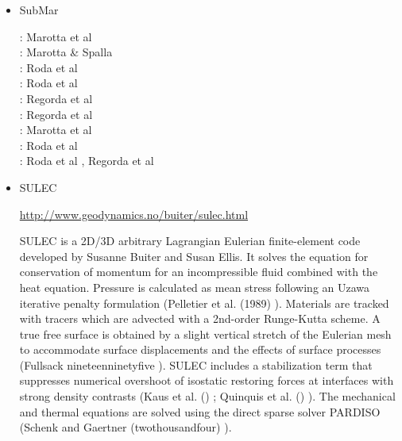 \begin{itemize}
\item {\codefont SubMar} 

\begin{scriptsize}
\twothousandsix: Marotta et al \cite{masr06}\\
\twothousandseven: Marotta \& Spalla \cite{masp07}\\
\twothousandten: Roda et al \cite{roms10}\\
\twothousandtwelve: Roda et al \cite{rosm12}\\
\twothousandthirteen: Regorda et al \cite{rems13}\\
\twothousandseventeen: Regorda et al \cite{rerm17}\\
\twothousandeighteen: Marotta et al \cite{marc18}\\
\twothousandnineteen: Roda et al \cite{rors19}\\
\twothousandtwenty: Roda et al \cite{rozr20}, Regorda et al \cite{relr20}
\end{scriptsize}


\item {\codefont SULEC} 

\url{http://www.geodynamics.no/buiter/sulec.html}

SULEC is a 2D/3D arbitrary Lagrangian Eulerian finite-element code developed by Susanne Buiter and Susan Ellis. 
It solves the equation for conservation of momentum for an incompressible fluid combined with 
the heat equation. Pressure is calculated as mean stress following an Uzawa iterative penalty 
formulation (Pelletier et al. (1989) \cite{pefc89}). 
Materials are tracked with tracers which are advected with a 2nd-order Runge-Kutta scheme. 
A true free surface is obtained by a slight vertical stretch of the Eulerian mesh to 
accommodate surface displacements and the effects of surface processes (Fullsack nineteenninetyfive \cite{full95}). 
SULEC includes a stabilization term that suppresses numerical overshoot of isostatic restoring forces 
at interfaces with strong density contrasts (Kaus et al. (\twothousandten) \cite{kamm10}; 
Quinquis et al. (\twothousandeleven) \cite{qube11}). The mechanical and thermal equations are solved using 
the direct sparse solver PARDISO (Schenk and Gaertner (twothousandfour) \cite{scga04}).



\end{itemize}
